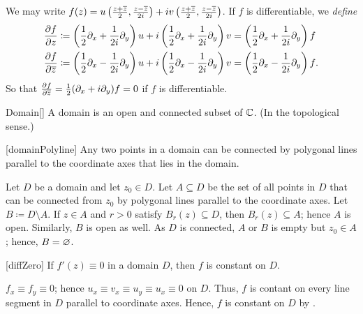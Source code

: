 \documentclass[../complex_variables_1.tex]{subfiles}
\begin{document}
\begin{note}
    We may write \(f(z) = u \left( \frac{z+\overline{z}}{2}, \frac{z-\overline{z}}{2i} \right) + iv \left(
    \frac{z+\overline{z}}{2}, \frac{z-\overline{z}}{2i} \right)\).
    If \(f\) is differentiable, we \emph{define}
    \begin{align*}
        \frac{\partial f}{\partial z} &\coloneqq
        \left( \frac{1}{2}\partial_x + \frac{1}{2i} \partial_y \right) u
        + i \left( \frac{1}{2} \partial_x + \frac{1}{2i} \partial_y \right) v
        = \left( \frac{1}{2} \partial_x + \frac{1}{2i} \partial_y \right) f \\
        \frac{\partial f}{\partial \overline{z}} &\coloneqq
        \left( \frac{1}{2}\partial_x - \frac{1}{2i} \partial_y \right) u
        + i \left( \frac{1}{2} \partial_x - \frac{1}{2i} \partial_y \right) v
        = \left( \frac{1}{2} \partial_x - \frac{1}{2i} \partial_y \right) f\text.
    \end{align*}
    So that \(\frac{\partial f}{\partial\overline{z}} = \frac{1}{2}(\partial_x + i\partial_y)f = 0\)
    if \(f\) is differentiable.
\end{note}

\begin{Definition}{Domain}[]
    A domain is an open and connected subset of \(\CC\). (In the topological sense.)
\end{Definition}

\begin{Theorem}{}[domainPolyline]
    Any two points in a domain can be connected by polygonal lines
    parallel to the coordinate axes
    that lies in the domain.
\end{Theorem}
\begin{myproof}[Proof]
    Let \(D\) be a domain and let \(z_0 \in D\).
    Let \(A \subseteq D\) be the set of all points in \(D\)
    that can be connected from \(z_0\) by polygonal lines parallel to the coordinate axes.
    Let \(B \coloneqq D \setminus A\).
    If \(z \in A\) and \(r > 0\) satisfy \(B_r(z) \subseteq D\), then
    \(B_r(z) \subseteq A\); hence \(A\) is open.
    Similarly, \(B\) is open as well.
    As \(D\) is connected, \(A\) or \(B\) is empty but \(z_0 \in A\); hence, \(B = \varnothing\).
\end{myproof}

\begin{Theorem}{}[diffZero]
    If \(f'(z) \equiv 0\) in a domain \(D\), then \(f\) is constant on \(D\).
\end{Theorem}
\begin{myproof}[Proof]
    \(f_x \equiv f_y \equiv 0\); hence \(u_x \equiv v_x \equiv u_y \equiv u_x \equiv 0\) on \(D\).
    Thus, \(f\) is contant on every line segment in \(D\) parallel to coordinate axes.
    Hence, \(f\) is constant on \(D\) by .
\end{myproof}
\end{document}
